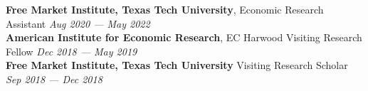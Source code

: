 \documentclass[a4paper,11pt]{article}
\begin{document}


\textbf{Free Market Institute, Texas Tech University}, Economic Research Assistant \hfill \textit{Aug 2020 --- May 2022} \\

\textbf{American Institute for Economic Research}, EC Harwood Visiting Research Fellow \hfill \textit{Dec 2018 --- May 2019}\\

\textbf{Free Market Institute, Texas Tech University} Visiting Research Scholar \hfill  \textit{Sep 2018 --- Dec 2018}\\
\end{document}

